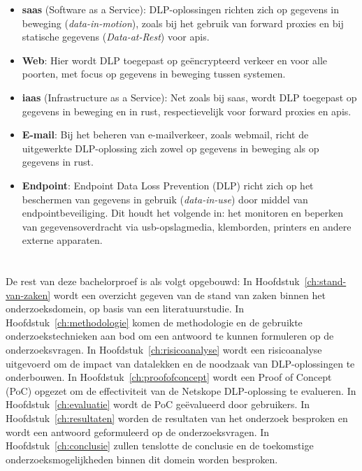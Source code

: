 \begin{itemize}
\item \textbf{\gls{saas}} (Software as a Service): DLP-oplossingen richten zich op gegevens in beweging (\textit{data-in-motion}), zoals bij het gebruik van forward proxies en bij statische gegevens (\textit{Data-at-Rest}) voor \gls{api}s.
\item \textbf{Web}: Hier wordt DLP toegepast op geëncrypteerd verkeer en voor alle poorten, met focus op gegevens in beweging tussen systemen.
\item \textbf{\gls{iaas}} (Infrastructure as a Service): Net zoals bij \gls{saas}, wordt DLP toegepast op gegevens in beweging en in rust, respectievelijk voor forward proxies en \gls{api}s.
\item \textbf{E-mail}: Bij het beheren van e-mailverkeer, zoals webmail, richt de uitgewerkte DLP-oplossing zich zowel op gegevens in beweging als op gegevens in rust.
\item \textbf{Endpoint}: Endpoint Data Loss Prevention (DLP) richt zich op het beschermen van gegevens in gebruik (\textit{data-in-use}) door middel van endpointbeveiliging. Dit houdt het volgende in: het monitoren en beperken van gegevensoverdracht via \gls{usb}-opslagmedia, klemborden, printers en andere externe apparaten.
\end{itemize}



\section{}%
\label{sec:opzet-bachelorproef}

De rest van deze bachelorproef is als volgt opgebouwd: 
In Hoofdstuk~\ref{ch:stand-van-zaken} wordt een overzicht gegeven van de stand van zaken binnen het onderzoeksdomein, op basis van een literatuurstudie. 
In Hoofdstuk~\ref{ch:methodologie} komen de methodologie en de gebruikte onderzoekstechnieken aan bod om een antwoord te kunnen formuleren op de onderzoeksvragen. 
In Hoofdstuk~\ref{ch:risicoanalyse} wordt een risicoanalyse uitgevoerd om de impact van datalekken en de noodzaak van DLP-oplossingen te onderbouwen. 
In Hoofdstuk~\ref{ch:proofofconcept} wordt een Proof of Concept (PoC) opgezet om de effectiviteit van de Netskope DLP-oplossing te evalueren. 
In Hoofdstuk~\ref{ch:evaluatie} wordt de PoC geëvalueerd door gebruikers. 
In Hoofdstuk~\ref{ch:resultaten} worden de resultaten van het onderzoek besproken en wordt een antwoord geformuleerd op de onderzoeksvragen. 
In Hoofdstuk~\ref{ch:conclusie} zullen tenslotte de conclusie en de toekomstige onderzoeksmogelijkheden binnen dit domein worden besproken. 

